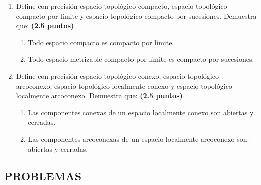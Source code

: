 \begin{enumerate}
    \item Define con precisión espacio topológico compacto, espacio topológico compacto por límite y espacio topológico compacto por sucesiones. Demuestra que:
    \hfill \textbf{(2.5 puntos)}
    \begin{enumerate}
        \item Todo espacio compacto es compacto por límite.
        \item Todo espacio metrizable compacto por límite es compacto por sucesiones.
    \end{enumerate}

    \item Define con precisión espacio topológico conexo, espacio topológico arcoconexo, espacio topológico localmente conexo y espacio topológico localmente arcoconexo. Demuestra que:
    \hfill \textbf{(2.5 puntos)}
    \begin{enumerate}
        \item Las componentes conexas de un espacio localmente conexo son abiertas y cerradas.
        \item Las componentes arcoconexas de un espacio localmente arcoconexo son abiertas y cerradas.
    \end{enumerate}
\end{enumerate}

\subsection*{PROBLEMAS}

